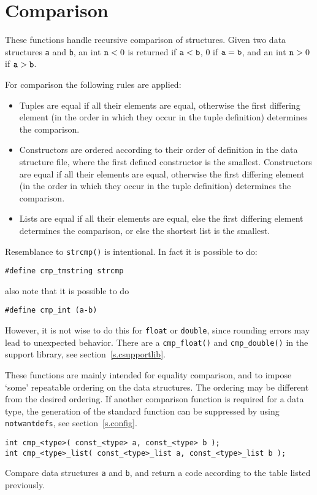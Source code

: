 \section{Comparison}
These functions handle recursive comparison of structures.
Given two data structures {\tt a} and {\tt b},
an int ${\tt n}<0$ is returned if ${\tt a}<{\tt b}$,
0 if ${\tt a}={\tt b}$,
and an int ${\tt n}>0$ if ${\tt a}>{\tt b}$.
\par
For comparison the following rules are applied:
\begin{itemize}
\item
Tuples are equal if all their elements are equal,
otherwise the first differing element (in the order in which they occur in
the tuple definition) determines the comparison.
\item
Constructors are ordered according to their order of definition in the
data structure file,
where the first defined constructor is the smallest.
Constructors are equal if all their elements are equal,
otherwise the first differing element (in the order in which they occur
in the tuple definition) determines the comparison.
\item
Lists are equal if all their elements are equal,
else the first differing element determines the comparison,
or else the shortest list is the smallest.
\end{itemize}
\par
Resemblance to {\tt strcmp()} is intentional. In fact it is possible to do:
\begin{showfile}
\begin{verbatim}
#define cmp_tmstring strcmp
\end{verbatim}
\end{showfile}
also note that it is possible to do
\begin{showfile}
\begin{verbatim}
#define cmp_int (a-b)
\end{verbatim}
\end{showfile}
However, it is not wise to do this for {\tt float} or {\tt double},
since rounding errors may lead to unexpected behavior.
There are a {\tt cmp\_float()} and {\tt cmp\_double()} in the support library,
see section~\ref{s.csupportlib}.
\par
These functions are mainly intended for equality comparison,
and to impose `some' repeatable ordering on the data structures.
The ordering may be different from the desired ordering.
If another comparison function is required for a data type,
the generation of the standard function can be suppressed by
using {\tt notwantdefs}, see section~\ref{s.config}.
\begin{verbatim}
int cmp_<type>( const_<type> a, const_<type> b );
int cmp_<type>_list( const_<type>_list a, const_<type>_list b );
\end{verbatim}
\begin{desc}
Compare data structures {\tt a} and {\tt b}, and return a code
according to the table listed previously.
\end{desc}
